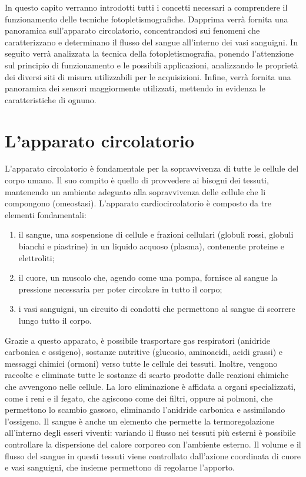 In questo capito verranno introdotti tutti i concetti necessari a comprendere il funzionamento delle tecniche fotopletismografiche. Dapprima verrà fornita una panoramica sull'apparato circolatorio, concentrandosi sui fenomeni che caratterizzano e determinano il flusso del sangue all'interno dei vasi sanguigni. In seguito verrà analizzata la tecnica della fotopletismografia, ponendo l'attenzione sul principio di funzionamento e le possibili applicazioni, analizzando le proprietà dei diversi siti di misura utilizzabili per le acquisizioni. Infine, verrà fornita una panoramica dei sensori maggiormente utilizzati, mettendo in evidenza le caratteristiche di ognuno.
\section{L'apparato circolatorio}
L'apparato circolatorio è fondamentale per la sopravvivenza di tutte le cellule del corpo umano. Il suo compito è quello di provvedere ai bisogni dei tessuti, mantenendo un ambiente adeguato alla sopravvivenza delle cellule che li compongono (omeostasi)\cite{Cevese2002}. 
L'apparato cardiocircolatorio è composto da tre elementi fondamentali:
\begin{enumerate}
\item il sangue, una sospensione di cellule e frazioni cellulari (globuli rossi, globuli bianchi e piastrine) in un liquido acquoso (plasma), contenente proteine e elettroliti;
\item il cuore, un muscolo che, agendo come una pompa, fornisce al sangue la pressione necessaria per poter circolare in tutto il corpo;
\item i vasi sanguigni, un circuito di condotti che permettono al sangue di scorrere lungo tutto il corpo.
\end{enumerate}
Grazie a questo apparato, è possibile trasportare gas respiratori (anidride carbonica e ossigeno), sostanze nutritive (glucosio, aminoacidi, acidi grassi) e messaggi chimici (ormoni) verso tutte le cellule dei tessuti. Inoltre, vengono raccolte e eliminate tutte le sostanze di scarto prodotte  dalle reazioni chimiche che avvengono nelle cellule. La loro eliminazione è affidata a organi specializzati, come i reni e il fegato, che agiscono come dei filtri, oppure ai polmoni, che permettono lo scambio gassoso, eliminando l'anidride carbonica e assimilando l'ossigeno. Il sangue è anche un elemento che permette la termoregolazione all'interno degli esseri viventi: variando il flusso nei tessuti più esterni è possibile controllare la dispersione del calore corporeo con l'ambiente esterno. Il volume e il flusso del sangue in questi tessuti viene controllato dall'azione coordinata di cuore e vasi sanguigni, che insieme permettono di regolarne l'apporto.

